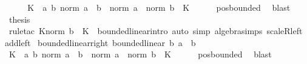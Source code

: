 \begin{isabellebody}
%
\isadelimproof
%
\endisadelimproof
%
\isatagproof
{}\isamarkupfalse%
\ {\isacharminus}{\kern0pt}\isanewline
\ \ \isamarkupfalse%
\ K\ \ {\isachardoublequoteopen}{\isasymAnd}a\ b{\isachardot}{\kern0pt}\ norm\ {\isacharparenleft}{\kern0pt}a\ {\isacharasterisk}{\kern0pt}{\isacharasterisk}{\kern0pt}\ b{\isacharparenright}{\kern0pt}\ {\isasymle}\ norm\ a\ {\isacharasterisk}{\kern0pt}\ norm\ b\ {\isacharasterisk}{\kern0pt}\ K{\isachardoublequoteclose}\isanewline
\ \ \ \ \isamarkupfalse%
\ pos{\isacharunderscore}{\kern0pt}bounded\ \isamarkupfalse%
\ blast\isanewline
\ \ \isamarkupfalse%
\ \isamarkupfalse%
\ {\isacharquery}{\kern0pt}thesis\isanewline
\ \ \ \ \isamarkupfalse%
\ {\isacharparenleft}{\kern0pt}rule{\isacharunderscore}{\kern0pt}tac\ K{\isacharequal}{\kern0pt}{\isachardoublequoteopen}norm\ b\ {\isacharasterisk}{\kern0pt}\ K{\isachardoublequoteclose}\ \ bounded{\isacharunderscore}{\kern0pt}linear{\isacharunderscore}{\kern0pt}intro{\isacharparenright}{\kern0pt}\ {\isacharparenleft}{\kern0pt}auto\ simp{\isacharcolon}{\kern0pt}\ algebra{\isacharunderscore}{\kern0pt}simps\ scaleR{\isacharunderscore}{\kern0pt}left\ add{\isacharunderscore}{\kern0pt}left{\isacharparenright}{\kern0pt}\isanewline
{}\isamarkupfalse%
%
\endisatagproof
{\isafoldproof}%
%
\isadelimproof
\isanewline
%
\endisadelimproof
\isanewline
{}\isamarkupfalse%
\ bounded{\isacharunderscore}{\kern0pt}linear{\isacharunderscore}{\kern0pt}right{\isacharcolon}{\kern0pt}\ {\isachardoublequoteopen}bounded{\isacharunderscore}{\kern0pt}linear\ {\isacharparenleft}{\kern0pt}{\isasymlambda}b{\isachardot}{\kern0pt}\ a\ {\isacharasterisk}{\kern0pt}{\isacharasterisk}{\kern0pt}\ b{\isacharparenright}{\kern0pt}{\isachardoublequoteclose}\isanewline
%
\isadelimproof
%
\endisadelimproof
%
\isatagproof
{}\isamarkupfalse%
\ {\isacharminus}{\kern0pt}\isanewline
\ \ \isamarkupfalse%
\ K\ \ {\isachardoublequoteopen}{\isasymAnd}a\ b{\isachardot}{\kern0pt}\ norm\ {\isacharparenleft}{\kern0pt}a\ {\isacharasterisk}{\kern0pt}{\isacharasterisk}{\kern0pt}\ b{\isacharparenright}{\kern0pt}\ {\isasymle}\ norm\ a\ {\isacharasterisk}{\kern0pt}\ norm\ b\ {\isacharasterisk}{\kern0pt}\ K{\isachardoublequoteclose}\isanewline
\ \ \ \ \isamarkupfalse%
\ pos{\isacharunderscore}{\kern0pt}bounded\ \isamarkupfalse%
\ blast\isanewline
\ \ \isamarkupfalse%
\ \isamarkupfalse%

\end{isabellebody}
